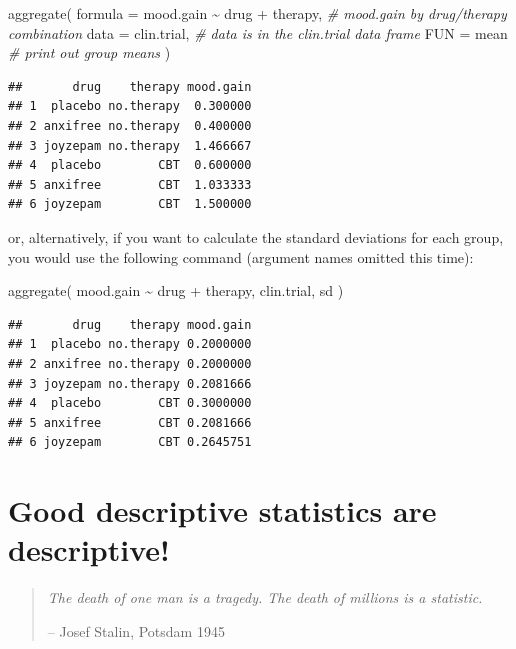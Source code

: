 \documentclass[
]{book}
\newenvironment{Shaded}{\begin{snugshade}}{\end{snugshade}}
\newcommand{\AttributeTok}[1]{\textcolor[rgb]{0.77,0.63,0.00}{#1}}
\newcommand{\CommentTok}[1]{\textcolor[rgb]{0.56,0.35,0.01}{\textit{#1}}}
\newcommand{\FunctionTok}[1]{\textcolor[rgb]{0.00,0.00,0.00}{#1}}
\newcommand{\NormalTok}[1]{#1}
\newcommand{\SpecialCharTok}[1]{\textcolor[rgb]{0.00,0.00,0.00}{#1}}
\begin{document}
\begin{Shaded}
\begin{Highlighting}[]
 \FunctionTok{aggregate}\NormalTok{( }\AttributeTok{formula =}\NormalTok{ mood.gain }\SpecialCharTok{\textasciitilde{}}\NormalTok{ drug }\SpecialCharTok{+}\NormalTok{ therapy,  }\CommentTok{\# mood.gain by drug/therapy combination}
            \AttributeTok{data =}\NormalTok{ clin.trial,                     }\CommentTok{\# data is in the clin.trial data frame}
            \AttributeTok{FUN =}\NormalTok{ mean                             }\CommentTok{\# print out group means}
\NormalTok{ )}
\end{Highlighting}
\end{Shaded}

\begin{verbatim}
##       drug    therapy mood.gain
## 1  placebo no.therapy  0.300000
## 2 anxifree no.therapy  0.400000
## 3 joyzepam no.therapy  1.466667
## 4  placebo        CBT  0.600000
## 5 anxifree        CBT  1.033333
## 6 joyzepam        CBT  1.500000
\end{verbatim}

or, alternatively, if you want to calculate the standard deviations for each group, you would use the following command (argument names omitted this time):

\begin{Shaded}
\begin{Highlighting}[]
\FunctionTok{aggregate}\NormalTok{( mood.gain }\SpecialCharTok{\textasciitilde{}}\NormalTok{ drug }\SpecialCharTok{+}\NormalTok{ therapy, clin.trial, sd )}
\end{Highlighting}
\end{Shaded}

\begin{verbatim}
##       drug    therapy mood.gain
## 1  placebo no.therapy 0.2000000
## 2 anxifree no.therapy 0.2000000
## 3 joyzepam no.therapy 0.2081666
## 4  placebo        CBT 0.3000000
## 5 anxifree        CBT 0.2081666
## 6 joyzepam        CBT 0.2645751
\end{verbatim}

\hypertarget{good-descriptive-statistics-are-descriptive}{%
\section{Good descriptive statistics are descriptive!}\label{good-descriptive-statistics-are-descriptive}}

\begin{quote}
\emph{The death of one man is a tragedy.
The death of millions is a statistic.}

-- Josef Stalin, Potsdam 1945
\end{quote}
\end{document}
